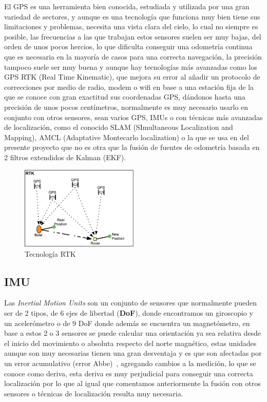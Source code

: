 El GPS es una herramienta bien conocida, estudiada y utilizada por una gran variedad de sectores, y aunque es una tecnología que funciona 
muy bien tiene sus limitaciones y problemas, necesita una vista clara del cielo, lo cual no siempre es posible, las frecuencias a las que trabajan estos 
sensores suelen ser muy bajas, del orden de unos pocos hercios, lo que dificulta conseguir una odometría continua que es necesaria en 
la mayoría de casos para una correcta navegación, la precisión tampoco suele ser muy buena y aunque hay tecnologías más avanzadas como los 
GPS RTK (Real Time Kinematic), que mejora su error al añadir un protocolo de correcciones por medio de radio, modem o wifi en base a una 
estación fija de la que se conoce con gran exactitud sus coordenadas GPS, dándonos hasta una precisión de unos pocos centímetros, 
normalmente es muy necesario usarlo en conjunto con otros sensores, sean varios GPS, IMUs o con técnicas más avanzadas de localización, 
como el conocido SLAM (SImultaneous Localization and Mapping), AMCL (Adaptative Montecarlo localization) o la que se usa en del presente 
proyecto que no es otra que la fusión de fuentes de odometría basada en 2 filtros extendidos de Kalman (EKF).

\begin{figure}[h]
    \centering
    \includegraphics[width=0.5\textwidth]{images/rtk_arquitecture.png}
    \caption{Tecnología RTK}
    \label{fig:rtk_tech}
\end{figure}
\subsection{IMU}

Las \textit{Inertial Motion Units} son un conjunto de sensores que normalmente pueden ser de 2 tipos, de 6 ejes de libertad (\textbf{DoF}), 
donde encontramos un giroscopio y un acelerómetro o de 9 DoF donde además se encuentra un magnetómetro, en base a 
estos 2 o 3 sensores se puede calcular una orientación ya sea relativa desde el inicio del movimiento o absoluta respecto del norte magnético, 
estas unidades aunque son muy necesarias tienen una gran desventaja y es que son afectadas por un error acumulativo (error Abbe)~\cite{errorAbbe23}, agregando cambios a 
la medición, lo que se conoce como deriva, esta deriva es muy perjudicial para conseguir una correcta localización por lo que al igual que 
comentamos anteriormente la fusión con otros sensores o técnicas de localización resulta muy necesaria.
\cleardoublepage

